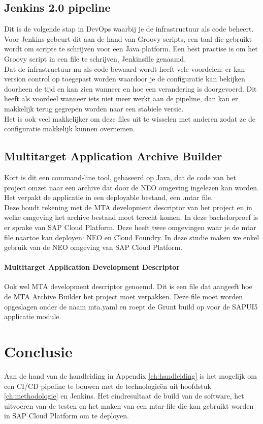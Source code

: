     \subsection{Jenkins 2.0 pipeline}
    Dit is de volgende stap in DevOps waarbij je de infrastructuur als code beheert. Voor Jenkins gebeurt dit aan de hand van Groovy scripts, een taal die gebruikt wordt om scripts te schrijven voor een Java platform. Een best practise is om het Groovy script in een file te schrijven, Jenkinsfile genaamd.\\
    Dat de infrastructuur nu als code bewaard wordt heeft vele voordelen: er kan version control op toegepast worden waardoor je de configuratie kan bekijken doorheen de tijd en kan zien wanneer en hoe een verandering is doorgevoerd. Dit heeft als voordeel wanneer iets niet meer werkt aan de pipeline, dan kan er makkelijk terug gegrepen worden naar een stabiele versie.\\
    Het is ook veel makkelijker om deze files uit te wisselen met anderen zodat ze de configuratie makkelijk kunnen overnemen.
    
    \subsection{Multitarget Application Archive Builder}
    Kort is dit een command-line tool, gebaseerd op Java, dat de code van het project omzet naar een archive dat door de NEO omgeving ingelezen kan worden. Het verpakt de applicatie in een deployable bestand, een .mtar file.\\
    Deze houdt rekening met de MTA development descriptor van het project en in welke omgeving het archive bestand moet terecht komen.
    In deze bachelorproef is er sprake van SAP Cloud Platform. Deze heeft twee omgevingen waar je de mtar file naartoe kan deployen: NEO en Cloud Foundry. In deze studie maken we enkel gebruik van de NEO omgeving van SAP Cloud Platform.
    
        \paragraph{Multitarget Application Development Descriptor}
        Ook wel MTA development descriptor genoemd. Dit is een file dat aangeeft hoe de MTA Archive Builder het project moet verpakken. Deze file moet worden opgeslagen onder de naam mta.yaml en roept de Grunt build op voor de SAPUI5 applicatie module.
    
\section{Conclusie}
\label{sec:conclusie}
Aan de hand van de handleiding in Appendix \ref{ch:handleiding} is het mogelijk om een CI/CD pipeline te bouwen met de technologieën uit hoofdstuk \ref{ch:methodologie} en Jenkins. Het eindresultaat de build van de software, het uitvoeren van de testen en het maken van een mtar-file die kan gebruikt worden in SAP Cloud Platform om te deployen.
